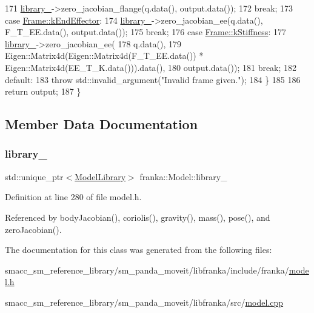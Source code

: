\begin{DoxyCode}
171       \hyperlink{classfranka_1_1Model_a966abbe74240654b093b4d18476ab09b}{library\_}->zero\_jacobian\_flange(q.data(), output.data());
172       \textcolor{keywordflow}{break};
173     \textcolor{keywordflow}{case} \hyperlink{namespacefranka_a00b729ddce916481d3f0d10febec4f5ba3617dcc7555dbca3c3e86e7535914fdf}{Frame::kEndEffector}:
174       \hyperlink{classfranka_1_1Model_a966abbe74240654b093b4d18476ab09b}{library\_}->zero\_jacobian\_ee(q.data(), F\_T\_EE.data(), output.data());
175       \textcolor{keywordflow}{break};
176     \textcolor{keywordflow}{case} \hyperlink{namespacefranka_a00b729ddce916481d3f0d10febec4f5ba4aa2dd9baea7adf953d69fcea698348f}{Frame::kStiffness}:
177       \hyperlink{classfranka_1_1Model_a966abbe74240654b093b4d18476ab09b}{library\_}->zero\_jacobian\_ee(
178           q.data(),
179           Eigen::Matrix4d(Eigen::Matrix4d(F\_T\_EE.data()) * Eigen::Matrix4d(EE\_T\_K.data())).data(),
180           output.data());
181       \textcolor{keywordflow}{break};
182     \textcolor{keywordflow}{default}:
183       \textcolor{keywordflow}{throw} std::invalid\_argument(\textcolor{stringliteral}{"Invalid frame given."});
184   \}
185 
186   \textcolor{keywordflow}{return} output;
187 \}
\end{DoxyCode}


\subsection{Member Data Documentation}
\mbox{\label{classfranka_1_1Model_a966abbe74240654b093b4d18476ab09b}} 
\subsubsection{\texorpdfstring{library\+\_\+}{library\_}}
{\footnotesize\ttfamily std\+::unique\+\_\+ptr$<$\hyperlink{classfranka_1_1ModelLibrary}{Model\+Library}$>$ franka\+::\+Model\+::library\+\_\+\hspace{0.3cm}{\ttfamily [private]}}



Definition at line 280 of file model.\+h.



Referenced by body\+Jacobian(), coriolis(), gravity(), mass(), pose(), and zero\+Jacobian().



The documentation for this class was generated from the following files\+:\begin{DoxyCompactItemize}
\item 
smacc\+\_\+sm\+\_\+reference\+\_\+library/sm\+\_\+panda\+\_\+moveit/libfranka/include/franka/\hyperlink{model_8h}{model.\+h}\item 
smacc\+\_\+sm\+\_\+reference\+\_\+library/sm\+\_\+panda\+\_\+moveit/libfranka/src/\hyperlink{model_8cpp}{model.\+cpp}\end{DoxyCompactItemize}
